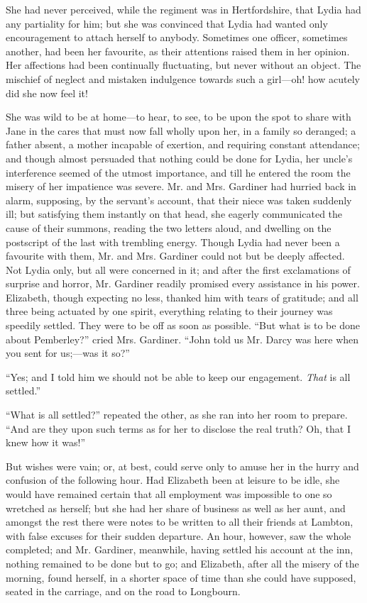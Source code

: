 She had never perceived, while the regiment was in Hertfordshire, that Lydia had any partiality for him; but she was convinced that Lydia had wanted only encouragement to attach herself to anybody. Sometimes one officer, sometimes another, had been her favourite, as their attentions raised them in her opinion. Her affections had been continually fluctuating, but never without an object. The mischief of neglect and mistaken indulgence towards such a girl---oh! how acutely did she now feel it!

She was wild to be at home---to hear, to see, to be upon the spot to share with Jane in the cares that must now fall wholly upon her, in a family so deranged; a father absent, a mother incapable of exertion, and requiring constant attendance; and though almost persuaded that nothing could be done for Lydia, her uncle's interference seemed of the utmost importance, and till he entered the room the misery of her impatience was severe. Mr. and Mrs. Gardiner had hurried back in alarm, supposing, by the servant's account, that their niece was taken suddenly ill; but satisfying them instantly on that head, she eagerly communicated the cause of their summons, reading the two letters aloud, and dwelling on the postscript of the last with trembling energy. Though Lydia had never been a favourite with them, Mr. and Mrs. Gardiner could not but be deeply affected. Not Lydia only, but all were concerned in it; and after the first exclamations of surprise and horror, Mr. Gardiner readily promised every assistance in his power. Elizabeth, though expecting no less, thanked him with tears of gratitude; and all three being actuated by one spirit, everything relating to their journey was speedily settled. They were to be off as soon as possible. ``But what is to be done about Pemberley?'' cried Mrs. Gardiner. ``John told us Mr. Darcy was here when you sent for us;---was it so?''

``Yes; and I told him we should not be able to keep our engagement. \textit{That} is all settled.''

``What is all settled?'' repeated the other, as she ran into her room to prepare. ``And are they upon such terms as for her to disclose the real truth? Oh, that I knew how it was!''

But wishes were vain; or, at best, could serve only to amuse her in the hurry and confusion of the following hour. Had Elizabeth been at leisure to be idle, she would have remained certain that all employment was impossible to one so wretched as herself; but she had her share of business as well as her aunt, and amongst the rest there were notes to be written to all their friends at Lambton, with false excuses for their sudden departure. An hour, however, saw the whole completed; and Mr. Gardiner, meanwhile, having settled his account at the inn, nothing remained to be done but to go; and Elizabeth, after all the misery of the morning, found herself, in a shorter space of time than she could have supposed, seated in the carriage, and on the road to Longbourn.



